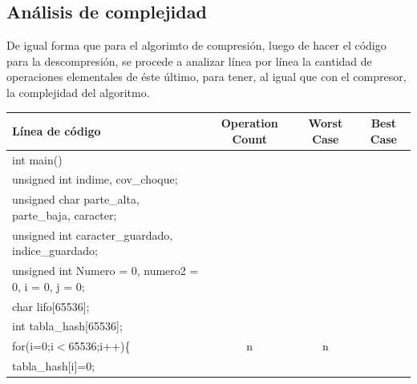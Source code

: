 \documentclass[letterpaper]{article}
\begin{document}
\subsection{Análisis de complejidad}
De igual forma que para el algorimto de compresión, luego de hacer el código para la descompresión, se procede a analizar línea por línea la cantidad de operaciones elementales de éste último, para tener, al igual que con el compresor, la complejidad del algoritmo.\\

{\raggedright
\vspace{3pt} \noindent
\begin{tabular}{|l|c|c|c|}
\hline
Línea de código & Operation Count & Worst Case & Best Case \\
\hline
\parbox{297pt}{\raggedright 
int main()} & \parbox{45pt}{} & \parbox{24pt}{} & \parbox{17pt}{} \\

\hline
\parbox{297pt}{\raggedright 
\hspace{0.5cm} unsigned int indime, cov\_choque;
} & \parbox{45pt}{} & \parbox{24pt}{} & \parbox{17pt}{} \\
\hline
\parbox{297pt}{\raggedright 
\hspace{0.5cm} unsigned char parte\_alta, parte\_baja, caracter;
} & \parbox{45pt}{} & \parbox{24pt}{} & \parbox{17pt}{} \\
\hline
\parbox{297pt}{\raggedright 
\hspace{0.5cm} unsigned int caracter\_guardado, indice\_guardado;
} & \parbox{45pt}{} & \parbox{24pt}{} & \parbox{17pt}{} \\
\hline
\parbox{297pt}{\raggedright 
\hspace{0.5cm} unsigned int Numero = 0, numero2 = 0, i = 0, j = 0;
} & \parbox{45pt}{} & \parbox{24pt}{} & \parbox{17pt}{} \\
\hline
\parbox{297pt}{\raggedright 
\hspace{0.5cm} char lifo[65536];
} & \parbox{45pt}{} & \parbox{24pt}{} & \parbox{17pt}{} \\
\hline
\parbox{297pt}{\raggedright 
\hspace{0.5cm} int tabla\_hash[65536];
} & \parbox{45pt}{} & \parbox{24pt}{} & \parbox{17pt}{} \\
\hline
\parbox{297pt}{\raggedright 
\hspace{0.5cm} for(i=0;i$<$65536;i++)\{
} & \parbox{45pt}{\centering n} & \parbox{24pt}{\centering n} & \parbox{17pt}{} \\
\hline
\parbox{297pt}{\raggedright 
\hspace{1cm} tabla\_hash[i]=0;
} & \parbox{45pt}{} & \parbox{24pt}{} & \parbox{17pt}{} \\



\end{tabular}}
\end{document}
